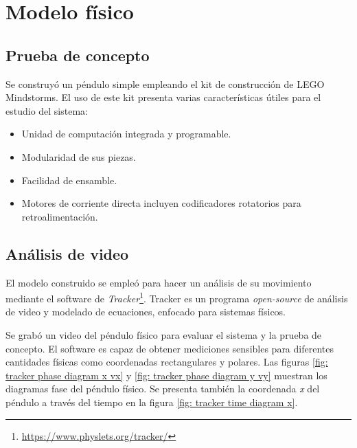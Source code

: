 \section{Modelo físico}
\subsection{Prueba de concepto}

Se construyó un péndulo simple empleando 
el kit de construcción de LEGO Mindstorms.
El uso de este kit presenta varias características
útiles para el estudio del sistema:
\begin{itemize}
 \item Unidad de computación integrada y programable.
 \item Modularidad de sus piezas.
 \item Facilidad de ensamble.
 \item Motores de corriente directa incluyen 
 codificadores rotatorios para retroalimentación.
\end{itemize}

\subsection{Análisis de video}

El modelo construido se empleó para hacer un análisis 
de su movimiento mediante el software de 
\emph{Tracker}\footnote{\url{https://www.physlets.org/tracker/}}.
Tracker es un programa \emph{open-source} de análisis de 
video y modelado de ecuaciones, 
enfocado para sistemas físicos.

Se grabó un video del péndulo físico para evaluar el sistema
y la prueba de concepto. 
El software es capaz de obtener mediciones sensibles para
diferentes cantidades físicas como coordenadas rectangulares
y polares.
Las figuras \ref{fig: tracker phase diagram x vx} y 
\ref{fig: tracker phase diagram y vy}
muestran los diagramas fase del péndulo físico.
Se presenta también la coordenada \emph{x}
del péndulo a través del tiempo en la figura \ref{fig: tracker time diagram x}.


